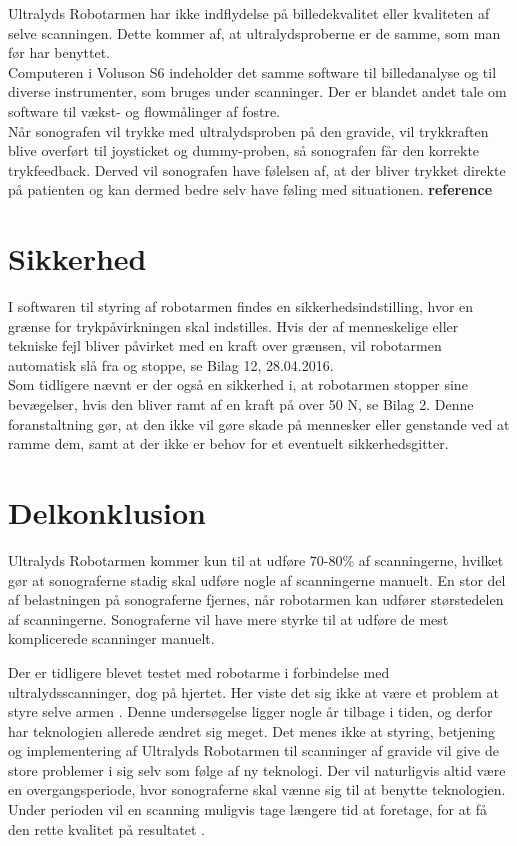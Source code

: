 Ultralyds Robotarmen har ikke indflydelse på billedekvalitet eller kvaliteten af selve scanningen. Dette kommer af, at ultralydsproberne er de samme, som man før har benyttet. \\
Computeren i Voluson S6 indeholder det samme software til billedanalyse og til diverse instrumenter, som bruges under scanninger. Der er blandet andet tale om software til vækst- og flowmålinger af fostre.   \\
Når sonografen vil trykke med ultralydsproben på den gravide, vil trykkraften blive overført til joysticket og dummy-proben, så sonografen får den korrekte trykfeedback. Derved vil sonografen have følelsen af, at der bliver trykket direkte på patienten og kan dermed bedre selv have føling med situationen. \textbf{reference} 

\section{Sikkerhed}
I softwaren til styring af robotarmen findes en sikkerhedsindstilling, hvor en grænse for trykpåvirkningen skal indstilles. Hvis der af menneskelige eller tekniske fejl bliver påvirket med en kraft over grænsen, vil robotarmen automatisk slå fra og stoppe, se Bilag 12, 28.04.2016. \\
Som tidligere nævnt er der også en sikkerhed i, at robotarmen stopper sine bevægelser, hvis den bliver ramt af en kraft på over 50 N, se Bilag 2. Denne foranstaltning gør, at den ikke vil gøre skade på mennesker eller genstande ved at ramme dem, samt at der ikke er behov for et eventuelt sikkerhedsgitter. 

\section{Delkonklusion}
Ultralyds Robotarmen kommer kun til at udføre 70-80\% af scanningerne, hvilket gør at sonograferne stadig skal udføre nogle af scanningerne manuelt. En stor del af belastningen på sonograferne fjernes, når robotarmen kan udfører størstedelen af scanningerne. Sonograferne vil have mere styrke til at udføre de mest komplicerede scanninger manuelt.

Der er tidligere blevet testet med robotarme i forbindelse med ultralydsscanninger, dog på hjertet. Her viste det sig ikke at være et problem at styre selve armen \cite{Hjerterobot}. Denne undersøgelse ligger nogle år tilbage i tiden, og derfor har teknologien allerede ændret sig meget. Det menes ikke at styring, betjening og implementering af Ultralyds Robotarmen til scanninger af gravide vil give de store problemer i sig selv som følge af ny teknologi. Der vil naturligvis altid være en overgangsperiode, hvor sonograferne skal vænne sig til at benytte teknologien. Under perioden vil en scanning muligvis tage længere tid at foretage, for at få den rette kvalitet på resultatet \cite{8}. 